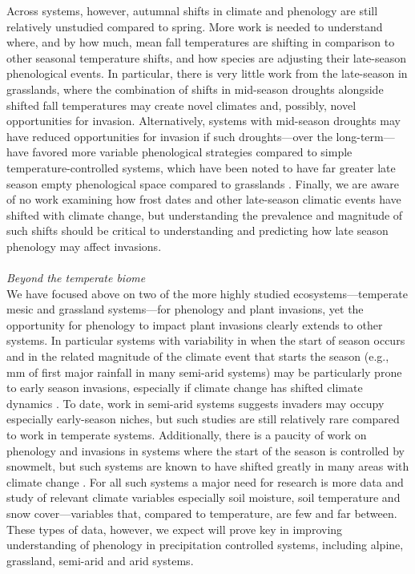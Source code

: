\documentclass[11pt,a4paper,oneside]{article}
\begin{document}
Across systems, however, autumnal shifts in climate and phenology are still relatively unstudied compared to spring. More work is needed to understand where, and by how much, mean fall temperatures are shifting in comparison to other seasonal temperature shifts, and how species are adjusting their late-season phenological events. In particular, there is very little work from the late-season in grasslands, where the combination of shifts in mid-season droughts alongside shifted fall temperatures may create novel climates and, possibly, novel opportunities for invasion. Alternatively, systems with mid-season droughts may have reduced opportunities for invasion if such droughts---over the long-term---have favored more variable phenological strategies \citep[e.g., species flower very late to avoid stress of mid-season drought, see][]{Craine:2012eco} compared to simple temperature-controlled systems, which have been noted to have far greater late season empty phenological space compared to grasslands \citep{Craine:2012eco}. Finally, we are aware of no work examining how frost dates and other late-season climatic events have shifted with climate change, but understanding the prevalence and magnitude of such shifts should be critical to understanding and predicting how late season phenology may affect invasions. \\
\\
\noindent \emph{Beyond the temperate biome}\\
We have focused above on two of the more highly studied ecosystems---temperate mesic and grassland systems---for phenology and plant invasions, yet the opportunity for phenology to impact plant invasions clearly extends to other systems. In particular systems with variability in when the start of season occurs and in the related magnitude of the climate event that starts the season (e.g., mm of first major rainfall in many semi-arid systems) may be particularly prone to early season invasions, especially if climate change has shifted climate dynamics \citep[for a longer discussion see][]{wolkovich:2010fee}. To date, work in semi-arid systems suggests invaders may occupy especially early-season niches, but such studies are still relatively rare compared to work in temperate systems. Additionally, there is a paucity of work on phenology and invasions in systems where the start of the season is controlled by snowmelt, but such systems are known to have shifted greatly in many areas with climate change \citep[e.g.,][]{pederson2011}. For all such systems a major need for research is more data and study of relevant climate variables especially soil moisture, soil temperature and snow cover---variables that, compared to temperature, are few and far between. These types of data, however, we expect will prove key in improving understanding of phenology in precipitation controlled systems, including alpine, grassland, semi-arid and arid systems.  \\
\end{document}
